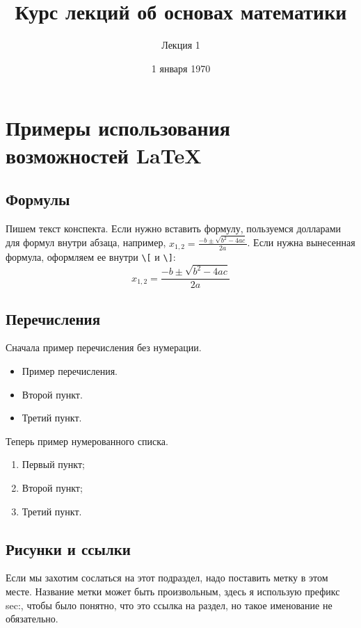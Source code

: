 \documentclass[russian]{lecture-notes}
\title{Курс лекций об основах математики}
\subtitle{Лекция 1}
\date{1 января 1970}
\begin{document}
\maketitle

\section{Примеры использования возможностей \LaTeX}
\subsection{Формулы}

Пишем текст конспекта.
Если нужно вставить формулу, пользуемся долларами для формул внутри абзаца,
например, $x_{1,2}=\frac{-b\pm\sqrt{b^2-4ac}}{2a}$.
Если нужна вынесенная формула, оформляем ее внутри
\texttt{\textbackslash[} и \texttt{\textbackslash]}:
\[x_{1,2}=\frac{-b\pm\sqrt{b^2-4ac}}{2a}\]

\subsection{Перечисления}

Сначала пример перечисления без нумерации.

\begin{itemize}
    \item Пример перечисления.
    \item Второй пункт.
    \item Третий пункт.
\end{itemize}
Теперь пример нумерованного списка.
\begin{enumerate}
    \item Первый пункт;
    \item Второй пункт;
    \item Третий пункт.
\end{enumerate}

\subsection{Рисунки и ссылки}
Если мы захотим сослаться на этот подраздел, надо поставить метку в этом месте.
Название метки может быть произвольным, здесь я использую префикс sec:, чтобы
было понятно, что это ссылка на раздел, но такое именование не обязательно.
\label{sec:images-and-refs}
\end{document}
